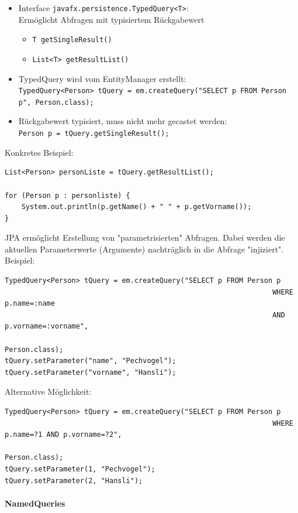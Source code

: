 \documentclass[a4paper]{article}
\begin{document}
					\begin{itemize}
						\item Interface \texttt{javafx.persistence.TypedQuery<T>}:\\
						Ermöglicht Abfragen mit typisiertem Rückgabewert
							\begin{itemize}
								\item \texttt{T getSingleResult()}
								\item \texttt{List<T> getResultList()}
							\end{itemize}
						\item TypedQuery wird vom EntityManager erstellt:\\
							\texttt{TypedQuery<Person> tQuery = em.createQuery("SELECT p FROM Person p", Person.class);}
						\item Rückgabewert typisiert, muss nicht mehr gecastet werden:\\
						\texttt{Person p = tQuery.getSingleResult();}\\
					\end{itemize}
					Konkretes Beispiel:
					\begin{lstlisting}
List<Person> personListe = tQuery.getResultList();

for (Person p : personliste) {
	System.out.println(p.getName() + " " + p.getVorname());
}
					\end{lstlisting}
					JPA ermöglicht Erstellung von "parametrisierten" Abfragen.
					Dabei werden die aktuellen Parameterwerte (Argumente) nachträglich in die Abfrage "injiziert". Beispiel:
					\begin{lstlisting}
TypedQuery<Person> tQuery = em.createQuery("SELECT p FROM Person p
																WHERE p.name=:name
																AND p.vorname=:vorname",
																Person.class);
tQuery.setParameter("name", "Pechvogel");
tQuery.setParameter("vorname", "Hansli");
					\end{lstlisting}
					Alternative Möglichkeit:
					\begin{lstlisting}
TypedQuery<Person> tQuery = em.createQuery("SELECT p FROM Person p
																WHERE p.name=?1 AND p.vorname=?2",
																Person.class);
tQuery.setParameter(1, "Pechvogel");
tQuery.setParameter(2, "Hansli");
					\end{lstlisting}
				
				\newpage
				
				\paragraph{NamedQueries}
					
\end{document}
